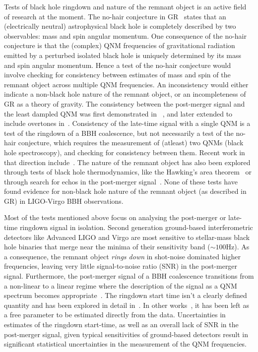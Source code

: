 \documentclass[twocolumn,prd,superscriptaddress,amsfonts,amssymb,amsmath,preprintnumbers]{revtex4-1}
\begin{document}
\par
Tests of black hole ringdown and nature of the remnant object is an active field of research at the moment. The no-hair conjecture in GR~\citep{} states that an (electrically neutral) astrophysical black hole is completely described by two observables: mass and spin angular momentum. One consequence of the no-hair conjecture is that the (complex) QNM frequencies of gravitational radiation emitted by a perturbed isolated black hole is uniquely determined by its mass and spin angular momentum. Hence a test of the no-hair conjecture would involve checking for consistency between estimates of mass and spin of the remnant object across multiple QNM frequencies. An inconsistency would either indicate a non-black hole nature of the remnant object, or an incompleteness of GR as a theory of gravity. The consistency between the post-merger signal and the least dampled QNM was first demonstrated in ~\citep{LSC_2016grtests}, and later extended to include overtones in~\citep{Giesler:2019uxc,Isi:2019aib,Bhagwat:2019dtm,Forteza:2020hbw}. Consistency of the late-time signal with a single QNM is a test of the ringdown of a BBH coalescence, but not necessarily a test of the no-hair conjecture, which requires the measurement of (atleast) two QNMs (black hole spectroscopy), and checking for consistency between them. Recent work in that direction include~\citep{Carullo:2018gah,Carullo:2019flw,Bhagwat:2019bwv}. The nature of the remnant object has also been explored through tests of black hole thermodynamics, like the Hawking's area theorem~\citep{Cabero:2017avf} or through search for echos in the post-merger signal~\citep{Nielsen:2018lkf,Tsang:2019zra,Lo:2018sep,Abedi:2018npz,Abedi:2020sgg,Testa:2018bzd}. None of these tests have found evidence for non-black hole nature of the remnant object (as described in GR) in LIGO-Virgo BBH observations.
\par
Most of the tests mentioned above focus on analysing the post-merger or late-time ringdown signal in isolation. Second generation ground-based interferometric detectors like Advanced LIGO and Virgo are most sensitive to stellar-mass black hole binaries that merge near the minima of their sensitivity band ($\sim 100$Hz). As a consequence, the remnant object \textit{rings down} in shot-noise dominated higher frequencies, leaving very little signal-to-noise ratio (SNR) in the post-merger signal. Furthermore, the post-merger signal of a BBH coalescence transitions from a non-linear to a linear regime where the description of the signal as a QNM spectrum becomes appropriate~\citep{}. The ringdown start time isn't a clearly defined quantity and has been explored in detail in~\citep{Bhagwat:2017tkm}. In other works~\citep{Carullo:2018gah,Carullo:2019flw}, it has been left as a free parameter to be estimated directly from the data. Uncertainties in estimates of the ringdown start-time, as well as an overall lack of SNR in the post-merger signal, given typical sensitivities of ground-based detectors result in significant statistical uncertainties in the measurement of the QNM frequencies.
\end{document}
